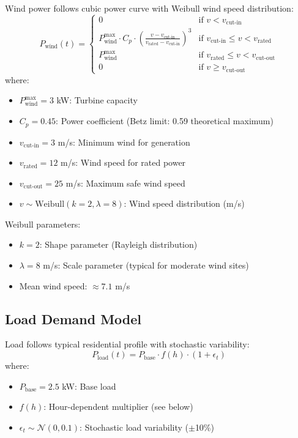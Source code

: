 \documentclass[11pt,a4paper]{article}
\begin{document}
Wind power follows cubic power curve with Weibull wind speed distribution:
\begin{equation}
P_{\text{wind}}(t) = \begin{cases}
0 & \text{if } v < v_{\text{cut-in}} \\
P_{\text{wind}}^{\max} \cdot C_p \cdot \left(\frac{v - v_{\text{cut-in}}}{v_{\text{rated}} - v_{\text{cut-in}}}\right)^3 & \text{if } v_{\text{cut-in}} \leq v < v_{\text{rated}} \\
P_{\text{wind}}^{\max} & \text{if } v_{\text{rated}} \leq v < v_{\text{cut-out}} \\
0 & \text{if } v \geq v_{\text{cut-out}}
\end{cases}
\end{equation}
where:
\begin{itemize}
    \item $P_{\text{wind}}^{\max} = 3$ kW: Turbine capacity
    \item $C_p = 0.45$: Power coefficient (Betz limit: 0.59 theoretical maximum)
    \item $v_{\text{cut-in}} = 3$ m/s: Minimum wind for generation
    \item $v_{\text{rated}} = 12$ m/s: Wind speed for rated power
    \item $v_{\text{cut-out}} = 25$ m/s: Maximum safe wind speed
    \item $v \sim \text{Weibull}(k=2, \lambda=8)$: Wind speed distribution (m/s)
\end{itemize}

Weibull parameters:
\begin{itemize}
    \item $k = 2$: Shape parameter (Rayleigh distribution)
    \item $\lambda = 8$ m/s: Scale parameter (typical for moderate wind sites)
    \item Mean wind speed: $\approx 7.1$ m/s
\end{itemize}

\subsection{Load Demand Model}

Load follows typical residential profile with stochastic variability:
\begin{equation}
P_{\text{load}}(t) = P_{\text{base}} \cdot f(h) \cdot (1 + \epsilon_t)
\end{equation}
where:
\begin{itemize}
    \item $P_{\text{base}} = 2.5$ kW: Base load
    \item $f(h)$: Hour-dependent multiplier (see below)
    \item $\epsilon_t \sim \mathcal{N}(0, 0.1)$: Stochastic load variability ($\pm$10\%)
\end{itemize}
\end{document}
